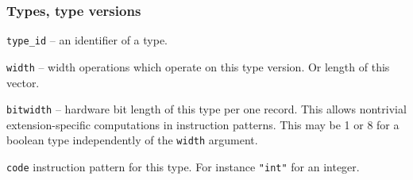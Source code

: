 \subsubsection{Types, type versions}
\begin{description}
        \item\texttt{type\_id} -- an identifier of a type.
        \item\texttt{width} -- width operations which operate on this type version. Or length of this vector.
        \item\texttt{bitwidth} -- hardware bit length of this type per one record. This allows nontrivial extension-specific computations in instruction patterns. This may be 1 or 8 for a boolean type independently of the \texttt{width} argument.
        \item\texttt{code} instruction pattern for this type. For instance \texttt{"int"} for an integer.
\end{description}


